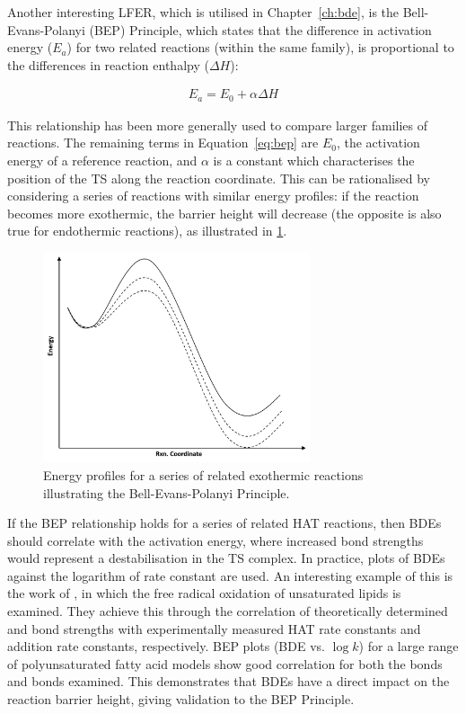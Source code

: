 Another interesting LFER, which is utilised in Chapter~\ref{ch:bde}, is the
Bell-Evans-Polanyi (BEP) Principle,\cite{Bell1936,Evans1938} which states that
the difference in activation energy ($E_a$) for two related reactions (within
the same family), is proportional to the differences in reaction enthalpy
($\Delta H$):

\begin{align}
  E_a = E_0 + \alpha \Delta H
  \label{eq:bep}
\end{align}

\noindent This relationship has been more generally used to compare larger
families of reactions. The remaining terms in Equation~\ref{eq:bep} are $E_0$,
the activation energy of a reference reaction, and $\alpha$ is a constant which
characterises the position of the TS along the reaction coordinate. This can be
rationalised by considering a series of reactions with similar energy profiles:
if the reaction becomes more exothermic, the barrier height will decrease (the
opposite is also true for endothermic reactions), as illustrated in
\ref{fig:bep}.

\begin{figure}[htb]
  \centering
  \includegraphics[width=0.7\textwidth]{figures/bep}
  \caption{Energy profiles for a series of related exothermic reactions
    illustrating the Bell-Evans-Polanyi Principle.}
\label{fig:bep}
\end{figure}

If the BEP relationship holds for a series of related HAT reactions, then BDEs
should correlate with the activation energy, where increased bond strengths
would represent a destabilisation in the TS complex. In practice, plots of BDEs
against the logarithm of rate constant are used. An interesting example of this
is the work of \citet{Pratt2003}, in which the free radical oxidation of
unsaturated lipids is examined. They achieve this through the correlation of
theoretically determined  and  bond strengths with experimentally
measured HAT rate constants and  addition rate constants,
respectively. BEP plots (BDE vs. $\log k$) for a large range of polyunsaturated
fatty acid models show good correlation for both the  bonds and 
bonds examined. This demonstrates that BDEs have a direct impact on the reaction
barrier height, giving validation to the BEP Principle.


